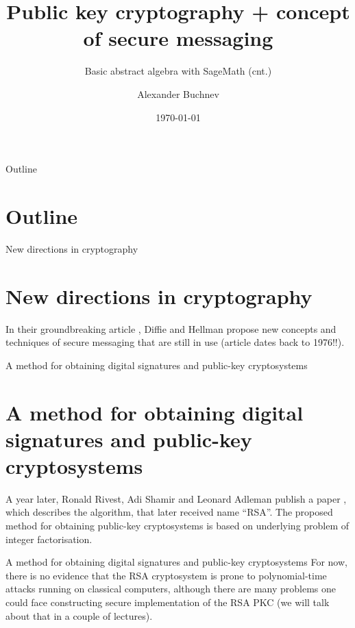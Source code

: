\documentclass{beamer}
\title{Public key cryptography + concept of secure messaging}
\subtitle{Basic abstract algebra with SageMath (cnt.)}
\author{Alexander Buchnev}
\date{\monthYear\today}
\begin{document}
\frame{
	\titlepage
}

\newtheorem{prop}{Proposition}


\begin{frame}{Outline}
    \section{Outline}
	\tableofcontents
\end{frame}

\begin{frame}{New directions in cryptography}
    \section{New directions in cryptography}
    In their groundbreaking article \cite{diffie-hellman:1976}, Diffie and Hellman propose new concepts and techniques
    of secure messaging that are still in use (article dates back to 1976!!).
\end{frame}

\begin{frame}{A method for obtaining digital signatures and public-key cryptosystems}
    \section{A method for obtaining digital signatures and public-key cryptosystems}
    A year later, Ronald Rivest, Adi Shamir and Leonard Adleman publish a paper \cite{rsa-1978}, which describes the algorithm, that
	later received name ``RSA''. The proposed method for obtaining public-key cryptosystems is based on underlying problem of integer
    factorisation. 
\end{frame}

\begin{frame}{A method for obtaining digital signatures and public-key cryptosystems}
    For now, there is no evidence that the RSA cryptosystem is prone to polynomial-time attacks running on classical
    computers, although there are many problems one could face constructing secure 
    implementation of the RSA PKC (we will talk about that in a couple of lectures).
\end{frame}
\end{document}
